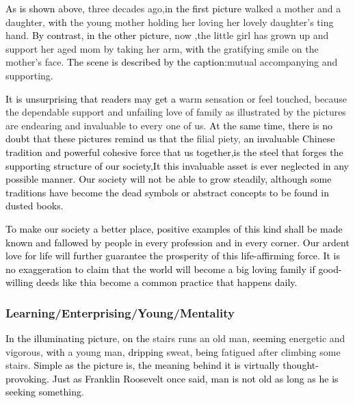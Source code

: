 \documentclass{article}
\begin{document}
\hspace{0.4cm} \textcolor{black}{As is shown above}, three decades ago,\textcolor{black}{in the
  first picture} walked a mother and a daughter, \textcolor{black}{with} the young mother
holding her loving her lovely daughter's ting hand. \textcolor{black}{By contrast, in the
  other picture}, now ,the little girl has grown up and support her aged mom by taking her
arm, \textcolor{black}{with} the gratifying smile on the mother's face. \textcolor{black}{The
  scene is described by the caption}:mutual accompanying and supporting.

\par \textcolor{black}{It is unsurprising that readers may get a} warm sensation or feel
touched, because the dependable support and unfailing love of family as illustrated by the
pictures are endearing and invaluable to every one of us. \textcolor{black}{At the same
  time, there is no doubt that these pictures remind us that the} filial piety,
\textcolor{black}{an invaluable Chinese tradition and powerful cohesive force that us
  together,is the steel that forges the supporting structure of our society,It this
  invaluable asset is ever neglected in any possible manner. Our society will not be able
  to grow steadily, although some traditions have become the dead symbols or abstract
  concepts to be found in dusted books.}

\par \textcolor{black}{To make our society a better place, positive examples of this kind
  shall be made known and fallowed by people in every profession and in every corner. Our
ardent love for life will further guarantee the prosperity of this life-affirming
force. It is no exaggeration to claim that the world will become a big loving family if
good-willing deeds like thia become a common practice that happens daily.}

\subsubsection{Learning/Enterprising/Young/Mentality}
\label{sec:learningenterprising}

\hspace{0.4cm} \textcolor{black}{In the illuminating picture}, \textcolor{black}{on the}
stairs runs an old man, \textcolor{black}{seeming} energetic and vigorous,
\textcolor{black}{with} a young man, \textcolor{black}{dripping} sweat, \textcolor{black}{being}
fatigued after climbing some stairs. \textcolor{black}{Simple as the picture is, the meaning
  behind it is virtually thought-provoking. Just as Franklin Roosevelt once said, man is
  not old as long as he is seeking something}.
\end{document}
